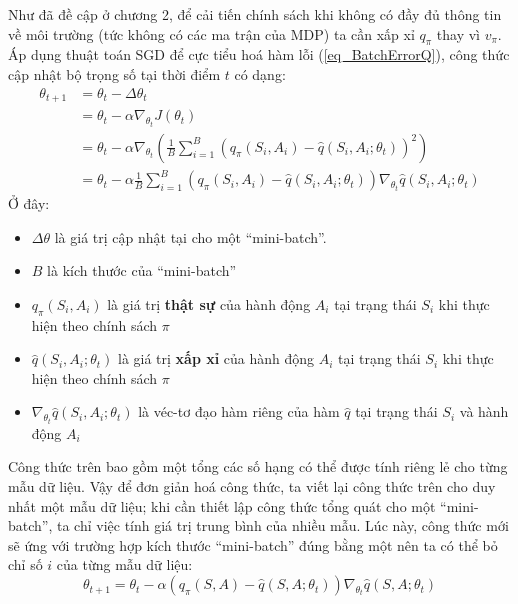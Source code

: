 	Như đã đề cập ở chương 2, để cải tiến chính sách khi không có đầy đủ thông tin về môi trường (tức không có các ma trận của MDP) ta cần xấp xỉ $q_{\pi}$ thay vì $v_{\pi}$. Áp dụng thuật toán SGD để cực tiểu hoá hàm lỗi (\ref{eq_BatchErrorQ}), công thức cập nhật bộ trọng số tại thời điểm $t$ có dạng:
	\begin{align}
		\theta_{t + 1} &= \theta_t - \Delta \theta_t\\
		&= \theta_t - \alpha \nabla_{\theta_t} J(\theta_t)\\
		&= \theta_t - \alpha \nabla_{\theta_t} \left( \frac{1}{B} \sum_{i = 1}^{B}(q_{\pi}(S_i,A_i) - \hat{q}(S_i,A_i;\theta_t))^2 \right)\\
		\label{eq_SGDTrueQ_Update}
		&= \theta_t - \alpha \frac{1}{B} \sum_{i = 1}^{B}(q_{\pi}(S_i,A_i) - \hat{q}(S_i,A_i;\theta_t)) \nabla_{\theta_t} \hat{q}(S_i, A_i;\theta_t)
	\end{align}
	Ở đây:
	\begin{itemize}
		\item $\Delta \theta$ là giá trị cập nhật tại cho một ``mini-batch''.
		\item $B$ là kích thước của ``mini-batch''
		\item $q_{\pi}(S_i,A_i)$ là giá trị \textbf{thật sự} của hành động $A_i$ tại trạng thái $S_i$ khi thực hiện theo chính sách $\pi$
		\item $\hat{q}(S_i,A_i;\theta_t)$ là giá trị \textbf{xấp xỉ} của hành động $A_i$ tại trạng thái $S_i$ khi thực hiện theo chính sách $\pi$
		\item $\nabla_{\theta_t} \hat{q}(S_i, A_i;\theta_t)$ là véc-tơ đạo hàm riêng của hàm $\hat{q}$ tại trạng thái $S_i$ và hành động $A_i$
	\end{itemize}
	Công thức trên bao gồm một tổng các số hạng có thể được tính riêng lẻ cho từng mẫu dữ liệu.
	Vậy để đơn giản hoá công thức, ta viết lại công thức trên cho duy nhất một mẫu dữ liệu; khi cần thiết lập công thức tổng quát cho một ``mini-batch'', ta chỉ việc tính giá trị trung bình của nhiều mẫu.
	Lúc này, công thức mới sẽ ứng với trường hợp kích thước ``mini-batch'' đúng bằng một nên ta có thể bỏ chỉ số $i$ của từng mẫu dữ liệu:
	\begin{equation}
		\label{eq_SGDTrueQ_Single_Update}
		\theta_{t+1} = \theta_t - \alpha (q_{\pi}(S,A) - \hat{q}(S,A;\theta_t)) \nabla_{\theta_t} \hat{q}(S, A;\theta_t)
	\end{equation}
	
